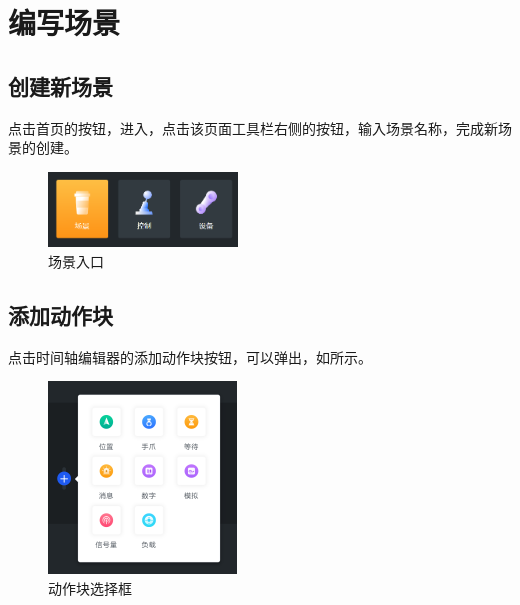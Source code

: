 
\clearpage

\section{编写场景}
\subsection{创建新场景}
点击\LM 首页的按钮，进入，点击该页面工具栏右侧的按钮，输入场景名称，完成新场景的创建。

\begin{figure}[ht]
	\centering
	\includegraphics[height=2cm]{screen/3-4.png}
	\caption{场景入口}
	\label{fig:场景入口}
\end{figure}

\subsection{添加动作块}


点击时间轴编辑器的添加动作块按钮，可以弹出，如所示。

\begin{figure}[ht]
	\centering
	\includegraphics[width=5cm]{image/07/图3.5 动作块选择框.png}
	\caption{动作块选择框}
	\label{fig:添加动作块弹出框}
\end{figure}

